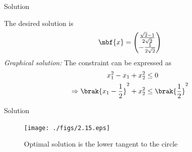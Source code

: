\documentclass{beamer}
\begin{document}


\begin{frame}{Solution}

The desired solution is
%
\begin{equation}
\mbf{x} = 
\begin{pmatrix}
 \frac{\sqrt{2}-1}{2\sqrt{2}} \\
-\frac{1}{2\sqrt{2}} 
\end{pmatrix}
\end{equation}
%
{\em Graphical solution:} The constraint can be expressed as
%
\begin{align}
x_1^2 - x_1 + x_2^2 &\le 0 \\
\Rightarrow \brak{x_1 - \frac{1}{2}}^2 + x_2^2 & \le \brak{\frac{1}{2}}^2
\end{align}
%
\end{frame}




\begin{frame}{Solution}

\begin{figure}[!ht]
\centering
\texttt{[image: ./figs/2.15.eps]}
\caption{ Optimal solution is the lower tangent to the circle}
\label{fig.2.15}	
\end{figure}
%

\end{frame}
\end{document}
